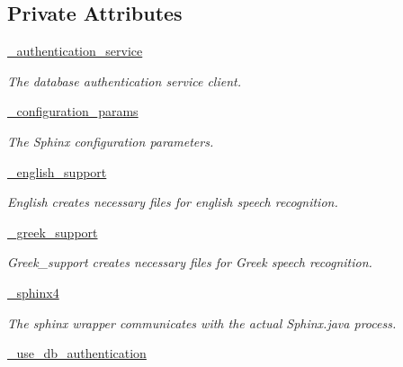 \subsection*{Private Attributes}
\begin{DoxyCompactItemize}
\item 
\hyperlink{classrapp__speech__detection__sphinx4_1_1speech__recognition__sphinx4_1_1SpeechRecognitionSphinx4_a3bec3325c78ed73478b35a9872589f1a}{\-\_\-authentication\-\_\-service}
\begin{DoxyCompactList}\small\item\em The database authentication service client. \end{DoxyCompactList}\item 
\hyperlink{classrapp__speech__detection__sphinx4_1_1speech__recognition__sphinx4_1_1SpeechRecognitionSphinx4_ab6a1a99c38bcc6938c0f0a39dd355a04}{\-\_\-configuration\-\_\-params}
\begin{DoxyCompactList}\small\item\em The Sphinx configuration parameters. \end{DoxyCompactList}\item 
\hyperlink{classrapp__speech__detection__sphinx4_1_1speech__recognition__sphinx4_1_1SpeechRecognitionSphinx4_ad506f14432d9452c85b900d79e03c589}{\-\_\-english\-\_\-support}
\begin{DoxyCompactList}\small\item\em English creates necessary files for english speech recognition. \end{DoxyCompactList}\item 
\hyperlink{classrapp__speech__detection__sphinx4_1_1speech__recognition__sphinx4_1_1SpeechRecognitionSphinx4_a4647fa82a552fe670b70550c5e66a253}{\-\_\-greek\-\_\-support}
\begin{DoxyCompactList}\small\item\em Greek\-\_\-support creates necessary files for Greek speech recognition. \end{DoxyCompactList}\item 
\hyperlink{classrapp__speech__detection__sphinx4_1_1speech__recognition__sphinx4_1_1SpeechRecognitionSphinx4_a01424766fb7384f6d005f4be78725af4}{\-\_\-sphinx4}
\begin{DoxyCompactList}\small\item\em The sphinx wrapper communicates with the actual Sphinx.\-java process. \end{DoxyCompactList}\item 
\hyperlink{classrapp__speech__detection__sphinx4_1_1speech__recognition__sphinx4_1_1SpeechRecognitionSphinx4_a8f26419fdb196abdf936de3ce2b773cf}{\-\_\-use\-\_\-db\-\_\-authentication}

\end{DoxyCompactItemize}
